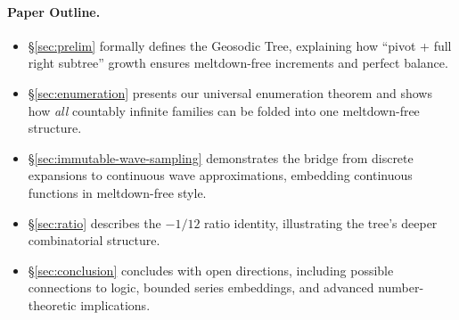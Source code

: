 \paragraph{Paper Outline.}
\begin{itemize}
  \item \S\ref{sec:prelim} formally defines the Geosodic Tree, explaining how “pivot + full 
        right subtree” growth ensures meltdown-free increments and perfect balance.
  \item \S\ref{sec:enumeration} presents our universal enumeration theorem and shows how 
        \emph{all} countably infinite families can be folded into one meltdown-free structure.
  \item \S\ref{sec:immutable-wave-sampling} demonstrates the bridge from discrete expansions 
        to continuous wave approximations, embedding continuous functions in meltdown-free style.
  \item \S\ref{sec:ratio} describes the $-1/12$ ratio identity, illustrating the tree’s 
        deeper combinatorial structure.
  \item \S\ref{sec:conclusion} concludes with open directions, including possible connections 
        to logic, bounded series embeddings, and advanced number-theoretic implications.
\end{itemize}

